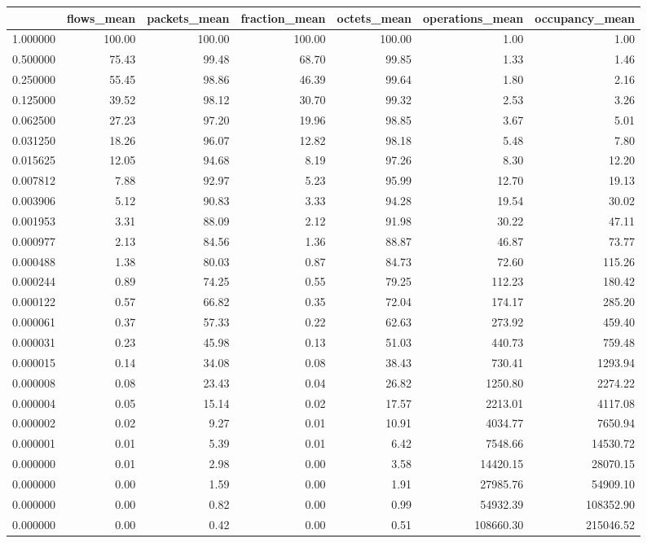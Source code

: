 \begin{tabular}{lrrrrrr}
\toprule
 & flows_mean & packets_mean & fraction_mean & octets_mean & operations_mean & occupancy_mean \\
\midrule
1.000000 & 100.00 & 100.00 & 100.00 & 100.00 & 1.00 & 1.00 \\
0.500000 & 75.43 & 99.48 & 68.70 & 99.85 & 1.33 & 1.46 \\
0.250000 & 55.45 & 98.86 & 46.39 & 99.64 & 1.80 & 2.16 \\
0.125000 & 39.52 & 98.12 & 30.70 & 99.32 & 2.53 & 3.26 \\
0.062500 & 27.23 & 97.20 & 19.96 & 98.85 & 3.67 & 5.01 \\
0.031250 & 18.26 & 96.07 & 12.82 & 98.18 & 5.48 & 7.80 \\
0.015625 & 12.05 & 94.68 & 8.19 & 97.26 & 8.30 & 12.20 \\
0.007812 & 7.88 & 92.97 & 5.23 & 95.99 & 12.70 & 19.13 \\
0.003906 & 5.12 & 90.83 & 3.33 & 94.28 & 19.54 & 30.02 \\
0.001953 & 3.31 & 88.09 & 2.12 & 91.98 & 30.22 & 47.11 \\
0.000977 & 2.13 & 84.56 & 1.36 & 88.87 & 46.87 & 73.77 \\
0.000488 & 1.38 & 80.03 & 0.87 & 84.73 & 72.60 & 115.26 \\
0.000244 & 0.89 & 74.25 & 0.55 & 79.25 & 112.23 & 180.42 \\
0.000122 & 0.57 & 66.82 & 0.35 & 72.04 & 174.17 & 285.20 \\
0.000061 & 0.37 & 57.33 & 0.22 & 62.63 & 273.92 & 459.40 \\
0.000031 & 0.23 & 45.98 & 0.13 & 51.03 & 440.73 & 759.48 \\
0.000015 & 0.14 & 34.08 & 0.08 & 38.43 & 730.41 & 1293.94 \\
0.000008 & 0.08 & 23.43 & 0.04 & 26.82 & 1250.80 & 2274.22 \\
0.000004 & 0.05 & 15.14 & 0.02 & 17.57 & 2213.01 & 4117.08 \\
0.000002 & 0.02 & 9.27 & 0.01 & 10.91 & 4034.77 & 7650.94 \\
0.000001 & 0.01 & 5.39 & 0.01 & 6.42 & 7548.66 & 14530.72 \\
0.000000 & 0.01 & 2.98 & 0.00 & 3.58 & 14420.15 & 28070.15 \\
0.000000 & 0.00 & 1.59 & 0.00 & 1.91 & 27985.76 & 54909.10 \\
0.000000 & 0.00 & 0.82 & 0.00 & 0.99 & 54932.39 & 108352.90 \\
0.000000 & 0.00 & 0.42 & 0.00 & 0.51 & 108660.30 & 215046.52 \\
\bottomrule
\end{tabular}
